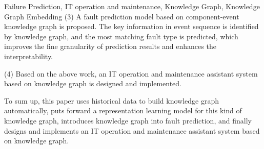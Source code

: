 \begin{englishabstract}{Failure Prediction, IT operation and maintenance, Knowledge Graph, Knowledge Graph Embedding}
(3) A fault prediction model based on component-event knowledge graph is proposed. The key information in event sequence is identified by knowledge graph, and the most matching fault type is predicted, which improves the fine granularity of prediction results and enhances the interpretability. 

(4) Based on the above work, an IT operation and maintenance assistant system based on knowledge graph is designed and implemented. 
    
To sum up, this paper uses historical data to build knowledge graph automatically, puts forward a representation learning model for this kind of knowledge graph, introduces knowledge graph into fault prediction, and finally designs and implements an IT operation and maintenance assistant system based on knowledge graph.
\end{englishabstract}
\cleardoublepage
{}
\cleardoublepage
\tableofcontents
\cleardoublepage
\listofothers
\cleardoublepage

      
